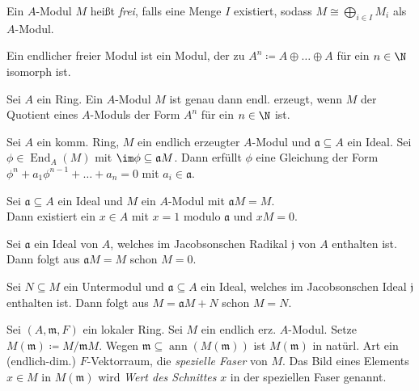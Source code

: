 \documentclass{cheat-sheet}
\DeclareMathOperator{\ann}{ann} %
\DeclareMathOperator{\End}{End} %
\newcommand{\aaa}{\mathfrak{a}}
\newcommand{\jjj}{\mathfrak{j}}
\newcommand{\mmm}{\mathfrak{m}}
\begin{document}

\begin{defn}
  Ein $A$-Modul $M$ heißt \emph{frei}, falls eine Menge $I$ existiert, sodass $M \cong {\bigoplus}_{i \in I} M_i$ als $A$-Modul.
\end{defn}

\begin{bem}
  Ein endlicher freier Modul ist ein Modul, der zu $A^n \coloneqq A \oplus \ldots \oplus A$ für ein $n \in \N$ isomorph ist.
\end{bem}

\begin{prop}
  Sei $A$ ein Ring. Ein $A$-Modul $M$ ist genau dann endl. erzeugt, wenn $M$ der Quotient eines $A$-Moduls der Form $A^n$ für ein $n \in \N$ ist.
\end{prop}


\begin{prop}
  Sei $A$ ein komm. Ring, $M$ ein endlich erzeugter $A$-Modul und $\aaa \subseteq A$ ein Ideal.
  Sei $\phi \in \End_A(M)$ mit $\im \phi \subseteq \aaa M$.
  Dann erfüllt $\phi$ eine Gleichung der Form $\phi^n + a_1 \phi^{n-1} + \ldots + a_n = 0$ mit $a_i \in \aaa$.
\end{prop}

\begin{kor}
  Sei $\aaa \subseteq A$ ein Ideal und $M$ ein $A$-Modul mit $\aaa M = M$. \\
  Dann existiert ein $x \in A$ mit $x = 1$ modulo $\aaa$ und $x M = 0$.
\end{kor}

\begin{lem}
  Sei $\aaa$ ein Ideal von $A$, welches im Jacobsonschen Radikal $\jjj$ von $A$ enthalten ist.
  Dann folgt aus $\aaa M = M$ schon $M = 0$.
\end{lem}

\begin{kor}
  Sei $N \subseteq M$ ein Untermodul und $\aaa \subseteq A$ ein Ideal, welches im Jacobsonschen Ideal $\jjj$ enthalten ist.
  Dann folgt aus $M = \aaa M + N$ schon $M = N$.
\end{kor}

\begin{defn}
  Sei $(A, \mmm, F)$ ein lokaler Ring.
  Sei $M$ ein endlich erz. $A$-Modul.
  Setze $M(\mmm) \coloneqq M/\mmm M$.
  Wegen $\mmm \subseteq \ann(M(\mmm))$ ist $M(\mmm)$ in natürl. Art ein (endlich-dim.) $F$-Vektorraum, die \emph{spezielle Faser} von $M$.
  Das Bild eines Elements $x \in M$ in $M(\mmm)$ wird \emph{Wert des Schnittes} $x$ in der speziellen Faser genannt.
\end{defn}
\end{document}

